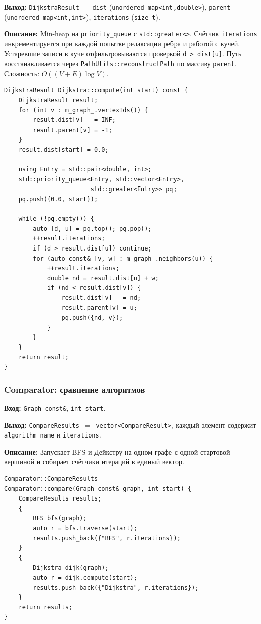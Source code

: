 \textbf{Выход:} \texttt{DijkstraResult}~--- \texttt{dist}
(\texttt{unordered\_map<int,double>}), \texttt{parent}
(\texttt{unordered\_map<int,int>}), \texttt{iterations} (\texttt{size\_t}).

\textbf{Описание:} Min-heap на \texttt{priority\_queue} с
\texttt{std::greater<>}. Счётчик \texttt{iterations} инкрементируется
при каждой попытке релаксации ребра и работой с кучей. Устаревшие записи в
куче отфильтровываются проверкой \texttt{d > dist[u]}.
Путь восстанавливается через \texttt{PathUtils::reconstructPath}
по массиву \texttt{parent}. Сложность: $O((V+E)\log{V})$.

\begin{lstlisting}[style=cppstyle, caption={Алгоритм Дейкстры (Dijkstra.cc)}]
DijkstraResult Dijkstra::compute(int start) const {
    DijkstraResult result;
    for (int v : m_graph_.vertexIds()) {
        result.dist[v]   = INF;
        result.parent[v] = -1;
    }
    result.dist[start] = 0.0;

    using Entry = std::pair<double, int>;
    std::priority_queue<Entry, std::vector<Entry>,
                        std::greater<Entry>> pq;
    pq.push({0.0, start});

    while (!pq.empty()) {
        auto [d, u] = pq.top(); pq.pop();
        ++result.iterations;
        if (d > result.dist[u]) continue;
        for (auto const& [v, w] : m_graph_.neighbors(u)) {
            ++result.iterations;
            double nd = result.dist[u] + w;
            if (nd < result.dist[v]) {
                result.dist[v]   = nd;
                result.parent[v] = u;
                pq.push({nd, v});
            }
        }
    }
    return result;
}
\end{lstlisting}

\subsubsection{Comparator: сравнение алгоритмов}

\textbf{Вход:} \texttt{Graph const\&}, \texttt{int start}.

\textbf{Выход:} \texttt{CompareResults}~$=$~\texttt{vector<CompareResult>},
каждый элемент содержит \texttt{algorithm\_name} и \texttt{iterations}.

\textbf{Описание:} Запускает BFS и Дейкстру на одном графе с одной
стартовой вершиной и собирает счётчики итераций в единый вектор.

\begin{lstlisting}[style=cppstyle, caption={Сравнение алгоритмов (Comparator.cc)}]
Comparator::CompareResults
Comparator::compare(Graph const& graph, int start) {
    CompareResults results;
    {
        BFS bfs(graph);
        auto r = bfs.traverse(start);
        results.push_back({"BFS", r.iterations});
    }
    {
        Dijkstra dijk(graph);
        auto r = dijk.compute(start);
        results.push_back({"Dijkstra", r.iterations});
    }
    return results;
}
\end{lstlisting}
